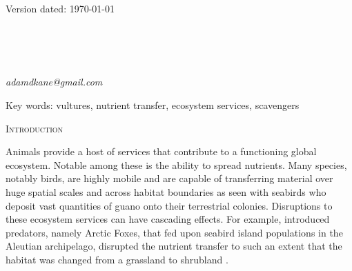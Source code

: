 \documentclass[12pt,letterpaper]{article}
\renewcommand{\section}[1]{%
\bigskip
\begin{center}
\begin{Large}
\normalfont\scshape #1
\medskip
\end{Large}
\end{center}}
\begin{document}
\begin{flushright}
Version dated: \today
\end{flushright}

\bigskip
\medskip
\begin{center}


\bigskip

\\
\\
\\
\end{center}
\medskip
{} \textit{adamdkane@gmail.com}\\  
\vspace{1in}

\modulolinenumbers[1]
\linenumbers

%
%
\newpage
\begin{abstract}

\end{abstract}

\noindent Key words: vultures, nutrient transfer, ecosystem services, scavengers\\


\vspace{1.5in}

%
%
\newpage 
\section{Introduction}
Animals provide a host of services that contribute to a functioning global ecosystem. Notable among these is the ability to spread nutrients. 
Many species, notably birds, are highly mobile and are capable of transferring material over huge spatial scales and across habitat boundaries as seen with seabirds who deposit vast quantities of guano onto their terrestrial colonies. Disruptions to these ecosystem services can have cascading effects. 
For example, introduced predators, namely Arctic Foxes, that fed upon seabird island populations in the Aleutian archipelago, disrupted the nutrient transfer to such an extent that the habitat was changed from a grassland to shrubland \cite{crollfox2015}. 
\end{document}
